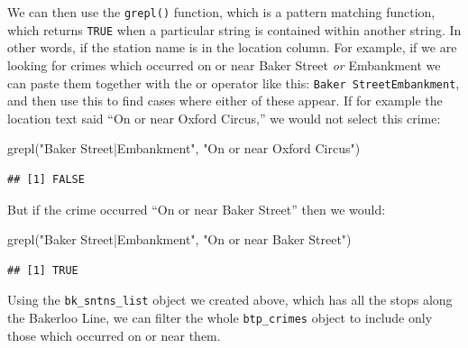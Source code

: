 \documentclass[
  krantz2]{krantz}
\makeatletter
\newenvironment{Shaded}{\begin{snugshade}}{\end{snugshade}}
\newcommand{\AttributeTok}[1]{\textcolor[rgb]{0.61,0.61,0.61}{#1}}
\newcommand{\FunctionTok}[1]{\textcolor[rgb]{0,0,0}{#1}}
\newcommand{\NormalTok}[1]{#1}
\newcommand{\OtherTok}[1]{\textcolor[rgb]{0.37,0.37,0.37}{#1}}
\newcommand{\SpecialCharTok}[1]{\textcolor[rgb]{0,0,0}{#1}}
\newcommand{\StringTok}[1]{\textcolor[rgb]{0.5,0.5,0.5}{#1}}
\newenvironment{kframe}{%
\medskip{}
\setlength{\fboxsep}{.8em}
 \def\at@end@of@kframe{}%
 \ifinner\ifhmode%
  \def\at@end@of@kframe{\end{minipage}}%
  \begin{minipage}{\columnwidth}%
 \fi\fi%
 \def\FrameCommand##1{\hskip\@totalleftmargin \hskip-\fboxsep
 \colorbox{shadecolor}{##1}\hskip-\fboxsep
     \hskip-\linewidth \hskip-\@totalleftmargin \hskip\columnwidth}%
 \MakeFramed {\advance\hsize-\width
   \@totalleftmargin\z@ \linewidth\hsize
   \@setminipage}}%
 {\par\unskip\endMakeFramed%
 \at@end@of@kframe}
\renewenvironment{Shaded}{\begin{kframe}}{\end{kframe}}
\makeatother
\begin{document}
\begin{Shaded}
\end{Shaded}

We can then use the \texttt{grepl()} function, which is a pattern matching function, which returns \texttt{TRUE} when a particular string is contained within another string. In other words, if the station name is in the location column. For example, if we are looking for crimes which occurred on or near Baker Street \emph{or} Embankment we can paste them together with the or operator like this: \texttt{Baker\ Street\textbar{}Embankment}, and then use this to find cases where either of these appear. If for example the location text said ``On or near Oxford Circus,'' we would not select this crime:

\begin{Shaded}
\begin{Highlighting}[]
\FunctionTok{grepl}\NormalTok{(}\StringTok{"Baker Street|Embankment"}\NormalTok{, }\StringTok{"On or near Oxford Circus"}\NormalTok{)}
\end{Highlighting}
\end{Shaded}

\begin{verbatim}
## [1] FALSE
\end{verbatim}

But if the crime occurred ``On or near Baker Street'' then we would:

\begin{Shaded}
\begin{Highlighting}[]
\FunctionTok{grepl}\NormalTok{(}\StringTok{"Baker Street|Embankment"}\NormalTok{, }\StringTok{"On or near Baker Street"}\NormalTok{)}
\end{Highlighting}
\end{Shaded}

\begin{verbatim}
## [1] TRUE
\end{verbatim}

Using the \texttt{bk\_sntns\_list} object we created above, which has all the stops along the Bakerloo Line, we can filter the whole \texttt{btp\_crimes} object to include only those which occurred on or near them.
\end{document}
